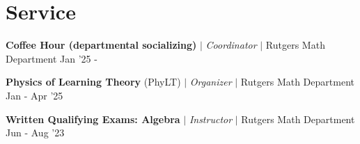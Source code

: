 \resumeSubHeadingListEnd









\section{Service}
\resumeSubHeadingListStart


\resumeProjectHeading
{\textbf{Coffee Hour (departmental socializing)} $|$ \textit{Coordinator} $|$ Rutgers Math Department}
{Jan '25 - }
{}
\vspace{\mygap}

\resumeProjectHeading
{\textbf{Physics of Learning Theory} (PhyLT) $|$ \textit{Organizer} $|$ Rutgers Math Department}
{Jan - Apr '25}
{}
\vspace{\mygap}

\resumeProjectHeading
{\textbf{Written Qualifying Exams: Algebra} $|$ \textit{Instructor} $|$ Rutgers Math Department}
{Jun - Aug '23}
{}
\vspace{\mygap}


